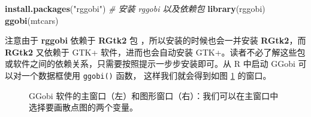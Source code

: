 \documentclass[
  b5paper,
  UTF8,twoside]{book}
\newenvironment{Shaded}{\begin{snugshade}}{\end{snugshade}}
\newcommand{\CommentTok}[1]{\textcolor[rgb]{0.56,0.35,0.01}{\textit{#1}}}
\newcommand{\FunctionTok}[1]{\textcolor[rgb]{0.13,0.29,0.53}{\textbf{#1}}}
\newcommand{\NormalTok}[1]{#1}
\newcommand{\StringTok}[1]{\textcolor[rgb]{0.31,0.60,0.02}{#1}}
\begin{document}
\begin{Shaded}
\begin{Highlighting}[]
\FunctionTok{install.packages}\NormalTok{(}\StringTok{"rggobi"}\NormalTok{) }\CommentTok{\# 安装 rggobi 以及依赖包}
\FunctionTok{library}\NormalTok{(rggobi)}
\FunctionTok{ggobi}\NormalTok{(mtcars)}
\end{Highlighting}
\end{Shaded}

注意由于 \textbf{rggobi} 依赖于 \textbf{RGtk2} 包 \citep{RGtk2}，所以安装的时候也会一并安装 \textbf{RGtk2}，而 \textbf{RGtk2} 又依赖于 GTK+ 软件，进而也会自动安装 GTK+。读者不必了解这些包或软件之间的依赖关系，只需要按照提示一步步安装即可。从 R 中启动 GGobi 可以对一个数据框使用 \texttt{ggobi()} 函数， 这样我们就会得到如图 \ref{fig:GGobi-main-window} 的窗口。

\begin{figure}

{\centering {}

}

\caption[GGobi 软件的主窗口和图形窗口 ]{GGobi 软件的主窗口（左）和图形窗口（右）：我们可以在主窗口中选择要画散点图的两个变量。}\label{fig:GGobi-main-window}
\end{figure}
\end{document}
